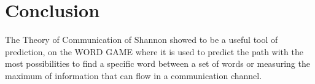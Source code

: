 \section{Conclusion}

The Theory of Communication of Shannon showed to be a useful tool of prediction, on the WORD GAME where it is used to predict the path with the
most possibilities to find a specific word between a set of words or measuring
the maximum of information that can flow in a communication channel.

\newpage